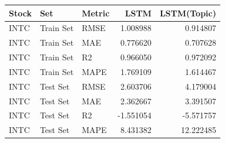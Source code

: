 \begin{tabular}{lllrr}
\toprule
Stock & Set & Metric & LSTM & LSTM(Topic) \\
\midrule
INTC & Train Set & RMSE & 1.008988 & 0.914807 \\
INTC & Train Set & MAE & 0.776620 & 0.707628 \\
INTC & Train Set & R2 & 0.966050 & 0.972092 \\
INTC & Train Set & MAPE & 1.769109 & 1.614467 \\
INTC & Test Set & RMSE & 2.603706 & 4.179004 \\
INTC & Test Set & MAE & 2.362667 & 3.391507 \\
INTC & Test Set & R2 & -1.551054 & -5.571757 \\
INTC & Test Set & MAPE & 8.431382 & 12.222485 \\
\bottomrule
\end{tabular}
